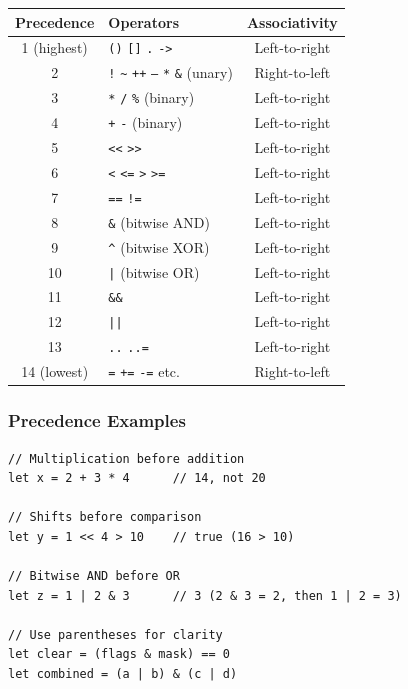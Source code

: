 \begin{center}
\begin{tabular}{clc}
\textbf{Precedence} & \textbf{Operators} & \textbf{Associativity} \\
\hline
1 (highest) & \texttt{()} \texttt{[]} \texttt{.} \texttt{->} & Left-to-right \\
2 & \texttt{!} \texttt{\textasciitilde} \texttt{++} \texttt{--} \texttt{*} \texttt{\&} (unary) & Right-to-left \\
3 & \texttt{*} \texttt{/} \texttt{\%} (binary) & Left-to-right \\
4 & \texttt{+} \texttt{-} (binary) & Left-to-right \\
5 & \texttt{<<} \texttt{>>} & Left-to-right \\
6 & \texttt{<} \texttt{<=} \texttt{>} \texttt{>=} & Left-to-right \\
7 & \texttt{==} \texttt{!=} & Left-to-right \\
8 & \texttt{\&} (bitwise AND) & Left-to-right \\
9 & \texttt{\textasciicircum} (bitwise XOR) & Left-to-right \\
10 & \texttt{|} (bitwise OR) & Left-to-right \\
11 & \texttt{\&\&} & Left-to-right \\
12 & \texttt{||} & Left-to-right \\
13 & \texttt{..} \texttt{..=} & Left-to-right \\
14 (lowest) & \texttt{=} \texttt{+=} \texttt{-=} etc. & Right-to-left \\
\end{tabular}
\end{center}

\subsubsection{Precedence Examples}

\begin{lstlisting}
// Multiplication before addition
let x = 2 + 3 * 4      // 14, not 20

// Shifts before comparison
let y = 1 << 4 > 10    // true (16 > 10)

// Bitwise AND before OR
let z = 1 | 2 & 3      // 3 (2 & 3 = 2, then 1 | 2 = 3)

// Use parentheses for clarity
let clear = (flags & mask) == 0
let combined = (a | b) & (c | d)
\end{lstlisting}

